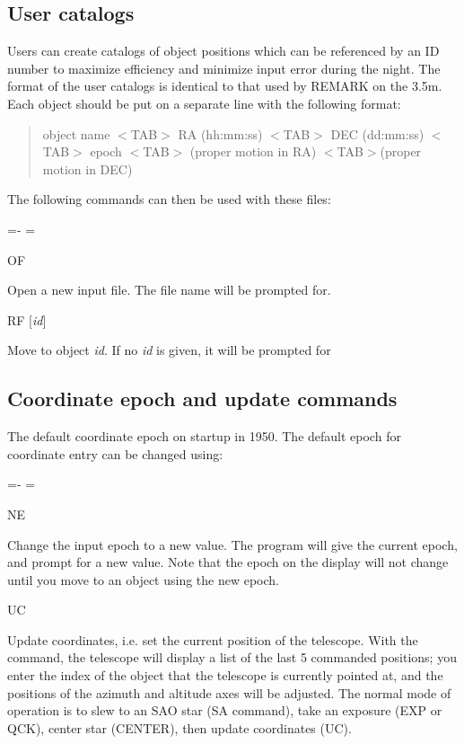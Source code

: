 \documentclass[10pt]{report}
\newenvironment{hanging}{
	\begin{list}{}{
		\labelsep=0pt
		\labelwidth=0pt
		\listparindent=0pt
		\itemindent=-\leftmargini
		\leftmargin=\leftmargini
	}
}{
	\end{list}
}
\begin{document}
\subsection{User catalogs}

Users can create catalogs of object positions which can be referenced by
an ID number to maximize efficiency and minimize input error during the
night. The format of the user catalogs is identical to that used by REMARK
on the 3.5m. Each object should be put on a separate line with the following
format:
\begin{quote}
object name $<$TAB$>$ RA (hh:mm:ss) $<$TAB$>$ DEC (dd:mm:ss) $<$TAB$>$ epoch $<$TAB$>$ (proper motion in RA) $<$TAB$>$(proper motion in DEC)
\end{quote}

The following commands can then be used with these files:

\begin{hanging}
\item{OF}

Open a new input file. The file name will be prompted for.

\item{RF [{\it id}]}

Move to object {\it id}. If no {\it id} is given, it will be prompted for

\end{hanging}

\subsection{Coordinate epoch and update commands}

The default coordinate epoch on startup in 1950. The default epoch for
coordinate entry can be changed using:

\begin{hanging}
\item{NE}

Change the input epoch to a new value. The program will give the current
epoch, and prompt for a new value. Note that the epoch on the display will
not change until you move to an object using the new epoch.

\item{UC}

Update coordinates, i.e. set the current position of the telescope. With
the command, the telescope will display a list of the last 5 commanded
positions; you enter the index of the object that the telescope is 
currently pointed at, and the positions of the azimuth and altitude
axes will be adjusted. The normal mode of operation is to slew to an
SAO star (SA command), take an exposure (EXP or QCK), center star (CENTER),
then update coordinates (UC).


\end{hanging}
\end{document}

